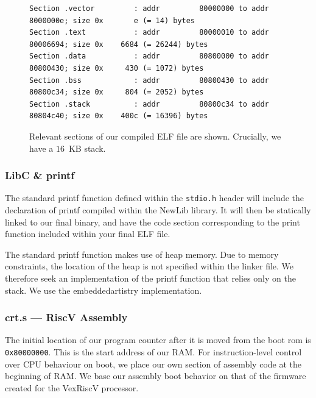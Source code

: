 \documentclass[a4paper,8pt]{report}
\begin{document}
\begin{figure}[h]
  \centering
  \scriptsize
\begin{BVerbatim}
Section .vector         : addr         80000000 to addr         8000000e; size 0x       e (= 14) bytes
Section .text           : addr         80000010 to addr         80006694; size 0x    6684 (= 26244) bytes
Section .data           : addr         80800000 to addr         80800430; size 0x     430 (= 1072) bytes
Section .bss            : addr         80800430 to addr         80800c34; size 0x     804 (= 2052) bytes
Section .stack          : addr         80800c34 to addr         80804c40; size 0x    400c (= 16396) bytes
\end{BVerbatim}
  \normalsize
  \caption{Relevant sections of our compiled ELF file are shown. Crucially, we
    have a $16$~KB stack.}
\end{figure}


\subsubsection{LibC \& printf}
The standard printf function defined within the \texttt{stdio.h} header will
include the declaration of printf compiled within the NewLib library. It will
then be statically linked to our final binary, and have the code section
corresponding to the print function included within your final ELF file.

The standard printf function makes use of heap memory. Due to memory
constraints, the location of the heap is not specified within the linker file.
We therefore seek an implementation of the printf function that relies only on
the stack. We use the embeddedartistry \cite{ea-printf} implementation.

\subsubsection{crt.s --- RiscV Assembly}
The initial location of our program counter after it is moved from the boot rom
is \texttt{0x80000000}. This is the start address of our RAM. For
instruction-level control over CPU behaviour on boot, we place our own section
of assembly code at the beginning of RAM. We base our assembly boot behavior on
that of the firmware created for the VexRiscV \cite{vexriscv} processor.
\end{document}
